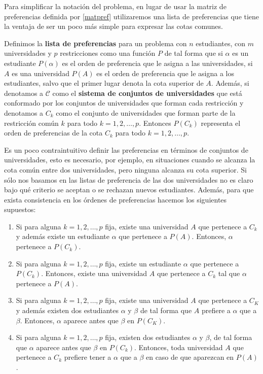 Para simplificar la notación del problema, en lugar de usar la matriz de preferencias definida por \ref{matpref} utilizaremos una lista de preferencias que tiene la ventaja de ser un poco más simple para expresar las cotas comunes. 

\begin{dfn}
\label{listpref}
Definimos la \textbf{lista de preferencias} para un problema con $n$ estudiantes, con $m$ universidades y $p$ restricciones
como una función $P$ de tal forma que si $\alpha$ es un estudiante $P(\alpha)$ es el orden de preferencia que le asigna a las universidades,
si $A$ es una universidad $P(A)$ es el orden de preferencia que le asigna a los estudiantes, salvo que el primer lugar denota la cota superior de $A$.
Además, si denotamos a $\mathcal{C}$ como el \textbf{sistema de conjuntos de universidades} %
que está conformado por los conjuntos de universidades que forman cada restricción y denotamos a $C_k$ como el conjunto de universidades que forman parte de la restricción común $k$ para todo $k=1,2,\dots,p$.
Entonces $P(C_k)$ representa el orden de preferencias de la cota $C_k$ para todo $k=1,2,\dots,p$.

Es un poco contraintuitivo definir las preferencias en términos de conjuntos de universidades, esto es necesario, por ejemplo, en situaciones cuando se alcanza la cota común entre dos universidades, pero ninguna alcanza su cota superior. Si sólo nos basamos en las listas de preferencia de las dos universidades no es claro bajo qué criterio se aceptan o se rechazan nuevos estudiantes. Además, para que exista consistencia en los órdenes de preferencias hacemos los siguientes supuestos:
\begin{enumerate}
\item Si para alguna $k=1,2,\dots,p$ fija, existe una universidad $A$ que pertenece a $C_k$ y además existe un estudiante $\alpha$ que pertenece a $P(A)$. Entonces, $\alpha$ pertenece a $P(C_k)$.
\item Si para alguna $k=1,2,\dots,p$ fija, existe un estudiante $\alpha$ que pertenece a $P(C_k)$. Entonces, existe una universidad $A$ que pertenece a $C_k$ tal que $\alpha$ pertenece a $P(A)$.
\item Si para alguna $k=1,2,\dots,p$ fija, existe una universidad $A$ que pertenece a $C_K$ y además existen dos estudiantes $\alpha$ y $\beta$ de tal forma que $A$ prefiere a $\alpha$ que a $\beta$. Entonces, $\alpha$ aparece antes que $\beta$ en $P(C_K)$.
\item Si para alguna $k=1,2,\dots,p$ fija, existen dos estudiantes $\alpha$ y $\beta$, de tal forma que $\alpha$ aparece antes que $\beta$ en $P(C_k)$. Entonces, toda universidad $A$ que pertenece a $C_k$ prefiere tener a $\alpha$ que a $\beta$ en caso de que aparezcan en $P(A)$.
\end{enumerate}
\end{dfn}

